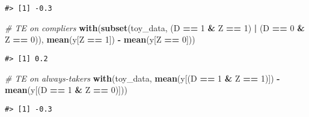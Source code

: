\documentclass[
]{article}
\newenvironment{Shaded}{\begin{snugshade}}{\end{snugshade}}
\newcommand{\CommentTok}[1]{\textcolor[rgb]{0.56,0.35,0.01}{\textit{#1}}}
\newcommand{\DecValTok}[1]{\textcolor[rgb]{0.00,0.00,0.81}{#1}}
\newcommand{\KeywordTok}[1]{\textcolor[rgb]{0.13,0.29,0.53}{\textbf{#1}}}
\newcommand{\NormalTok}[1]{#1}
\newcommand{\OperatorTok}[1]{\textcolor[rgb]{0.81,0.36,0.00}{\textbf{#1}}}
\newcommand{\StringTok}[1]{\textcolor[rgb]{0.31,0.60,0.02}{#1}}
\begin{document}
\begin{verbatim}
#> [1] -0.3
\end{verbatim}

\begin{Shaded}
\begin{Highlighting}[]
\CommentTok{\# TE on compliers}
\KeywordTok{with}\NormalTok{(}\KeywordTok{subset}\NormalTok{(toy\_data, (D }\OperatorTok{==}\StringTok{ }\DecValTok{1} \OperatorTok{\&}\StringTok{ }\NormalTok{Z }\OperatorTok{==}\StringTok{ }\DecValTok{1}\NormalTok{) }\OperatorTok{|}\StringTok{ }\NormalTok{(D }\OperatorTok{==}\StringTok{ }\DecValTok{0} \OperatorTok{\&}\StringTok{ }\NormalTok{Z }\OperatorTok{==}\StringTok{ }\DecValTok{0}\NormalTok{)), }
     \KeywordTok{mean}\NormalTok{(y[Z }\OperatorTok{==}\StringTok{ }\DecValTok{1}\NormalTok{]) }\OperatorTok{{-}}\StringTok{ }\KeywordTok{mean}\NormalTok{(y[Z }\OperatorTok{==}\StringTok{ }\DecValTok{0}\NormalTok{]))}
\end{Highlighting}
\end{Shaded}

\begin{verbatim}
#> [1] 0.2
\end{verbatim}

\begin{Shaded}
\begin{Highlighting}[]
\CommentTok{\# TE on always{-}takers}
\KeywordTok{with}\NormalTok{(toy\_data, }\KeywordTok{mean}\NormalTok{(y[(D }\OperatorTok{==}\StringTok{ }\DecValTok{1} \OperatorTok{\&}\StringTok{ }\NormalTok{Z }\OperatorTok{==}\StringTok{ }\DecValTok{1}\NormalTok{)]) }\OperatorTok{{-}}\StringTok{ }\KeywordTok{mean}\NormalTok{(y[(D }\OperatorTok{==}\StringTok{ }\DecValTok{1} \OperatorTok{\&}\StringTok{ }\NormalTok{Z }\OperatorTok{==}\StringTok{ }\DecValTok{0}\NormalTok{)]))}
\end{Highlighting}
\end{Shaded}

\begin{verbatim}
#> [1] -0.3
\end{verbatim}
\end{document}
